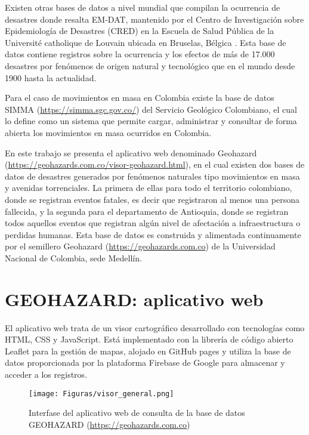 \documentclass{article}
\begin{document}
Existen otras bases de datos a nivel mundial que compilan la ocurrencia de desastres donde resalta EM-DAT, mantenido por el Centro de Investigación sobre Epidemiología de Desastres (CRED) en la Escuela de Salud Pública de la Université catholique de Louvain ubicada en Bruselas, Bélgica \cite{guha2002quality}. Esta base de datos contiene registros sobre la ocurrencia y los efectos de más de 17.000 desastres por fenómenos de origen natural y tecnológico que en el mundo desde 1900 hasta la actualidad.

Para el caso de movimientos en masa en Colombia existe la base de datos SIMMA (\url{https://simma.sgc.gov.co/}) del Servicio Geológico Colombiano, el cual lo define como un sistema que permite cargar, administrar y consultar de forma abierta los movimientos en masa ocurridos en Colombia.

En este trabajo se presenta el aplicativo web denominado Geohazard (\url{https://geohazards.com.co/visor-geohazard.html}), en el cual existen dos bases de datos de desastres generados por fenómenos naturales tipo movimientos en masa y avenidas torrenciales. La primera de ellas para todo el territorio colombiano, donde se registran eventos fatales, es decir que registraron al menos una persona fallecida, y la segunda para el departamento de Antioquia, donde se registran todos aquellos eventos que registran algún nivel de afectación a infraestructura o perdidas humanas. Esta base de datos es construida y alimentada continuamente por el semillero Geohazard (\url{https://geohazards.com.co}) de la Universidad Nacional de Colombia, sede Medellín.

\section{GEOHAZARD: aplicativo web}
El aplicativo web trata de un visor cartográfico desarrollado con tecnologías como HTML, CSS y JavaScript. Está implementado con la librería de código abierto Leaflet para la gestión de mapas, alojado en GitHub pages y utiliza la base de datos proporcionada por la plataforma Firebase de Google para almacenar y acceder a los registros.

\begin{figure}[ht!]
    \centering
      {\texttt{[image: Figuras/visor\_general.png]}}
    \caption{Interfase del aplicativo web de consulta de la base de datos GEOHAZARD (\url{https://geohazards.com.co})}
    \label{fig:app}
\end{figure}
\end{document}

